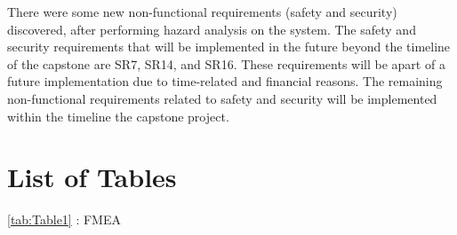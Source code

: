 \documentclass{article}
\begin{document}
There were some new non-functional requirements (safety and security) discovered, 
after performing hazard analysis on the system. The safety and security requirements 
that will be implemented in the future beyond the timeline of the capstone are SR7, 
SR14, and SR16. These requirements will be apart of a future implementation due to 
time-related and financial reasons. The remaining non-functional requirements related 
to safety and security will be implemented within the timeline the capstone project.

\section{List of Tables}
\autoref{tab:Table1} : FMEA
\end{document}
